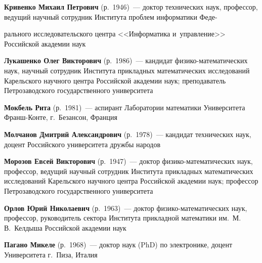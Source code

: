 \begin{multicols}{2}
 \vspace*{3pt}
 
 \noindent
 \textbf{Кривенко Михаил Петрович} (р.\ 1946)~--- 
 доктор технических наук, профессор, ведущий научный сотруд\-ник Института проб\-лем 
 информатики Феде-\linebreak\vspace*{-12pt}
 
 \columnbreak
 
 \noindent
 рального исследовательского центра <<Информатика и~управ\-ле\-ние>> 
 Российской академии наук

 \vspace*{3pt}

\noindent
\textbf{Лукашенко Олег Викторович} (р.\ 1986)~--- 
кандидат фи\-зи\-ко-ма\-те\-ма\-ти\-че\-ских наук, 
научный сотрудник Института прикладных математических исследований 
Карельского научного центра Российской академии наук; 
преподаватель Петрозаводского государственного университета 

\vspace*{3pt}

\noindent
\textbf{Мокбель Рита} (р.\ 1981)~---
 аспирант Лаборатории математики Университета Франш-Кон\-те, г.~Безансон, Франция
 
 \vspace*{3pt}

\noindent
\textbf{Молчанов Дмитрий Александрович} (р.\ 1978)~--- кандидат технических наук, 
доцент Российского университета дружбы народов

\vspace*{3pt}

\noindent
\textbf{Морозов Евсей Викторович} (р.\ 1947)~---
доктор фи\-зи\-ко-ма\-те\-ма\-ти\-че\-ских наук, профессор, 
ведущий научный сотрудник Института прикладных математических исследований 
Карельского научного центра Российской академии наук; профессор Петрозаводского 
государственного университета 

\vspace*{3pt}

\noindent
\textbf{Орлов Юрий Николаевич} (р.\ 1963)~--- 
доктор фи\-зи\-ко-ма\-те\-ма\-ти\-че\-ских наук, профессор, 
руководитель сектора Института прикладной математики им.\ М.\,В.~Келдыша 
Российской академии наук

\vspace*{3pt}

\noindent
\textbf{Пагано Микеле} (р.\ 1968)~--- доктор наук (PhD) по электронике, 
доцент Университета г.~Пиза, Италия 


\end{multicols}
